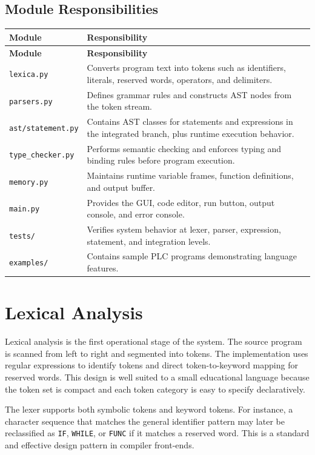 \documentclass[12pt,a4paper]{article}
\begin{document}
\subsection{Module Responsibilities}
\begin{longtable}{>{\raggedright\arraybackslash}p{3.2cm} >{\raggedright\arraybackslash}p{10.5cm}}
\toprule
\textbf{Module} & \textbf{Responsibility} \\
\midrule
\endfirsthead
\toprule
\textbf{Module} & \textbf{Responsibility} \\
\midrule
\endhead
\texttt{lexica.py} & Converts program text into tokens such as identifiers, literals, reserved words, operators, and delimiters. \\
\texttt{parsers.py} & Defines grammar rules and constructs AST nodes from the token stream. \\
\texttt{ast/statement.py} & Contains AST classes for statements and expressions in the integrated branch, plus runtime execution behavior. \\
\texttt{type\_checker.py} & Performs semantic checking and enforces typing and binding rules before program execution. \\
\texttt{memory.py} & Maintains runtime variable frames, function definitions, and output buffer. \\
\texttt{main.py} & Provides the GUI, code editor, run button, output console, and error console. \\
\texttt{tests/} & Verifies system behavior at lexer, parser, expression, statement, and integration levels. \\
\texttt{examples/} & Contains sample PLC programs demonstrating language features. \\
\bottomrule
\end{longtable}

\section{Lexical Analysis}
Lexical analysis is the first operational stage of the system. The source program is scanned from left to right and segmented into tokens. The implementation uses regular expressions to identify tokens and direct token-to-keyword mapping for reserved words. This design is well suited to a small educational language because the token set is compact and each token category is easy to specify declaratively.

The lexer supports both symbolic tokens and keyword tokens. For instance, a character sequence that matches the general identifier pattern may later be reclassified as \texttt{IF}, \texttt{WHILE}, or \texttt{FUNC} if it matches a reserved word. This is a standard and effective design pattern in compiler front-ends.
\end{document}
